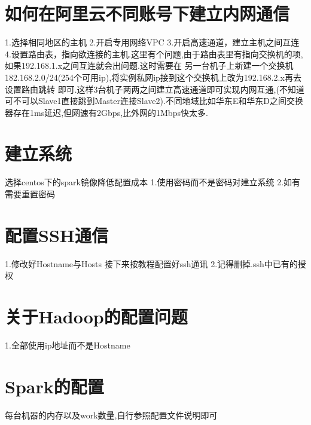 \section{如何在阿里云不同账号下建立内网通信}
1.选择相同地区的主机
2.开启专用网络VPC
3.开启高速通道，建立主机之间互连
4.设置路由表，指向欲连接的主机.这里有个问题,由于路由表里有指向交换机的项,如果192.168.1.x之间互连就会出问题.这时需要在
另一台机子上新建一个交换机182.168.2.0/24(254个可用ip),将实例私网ip接到这个交换机上改为192.168.2.x再去设置路由跳转
即可.这样3台机子两两之间建立高速通道即可实现内网互通,(不知道可不可以Slave1直接跳到Master连接Slave2).不同地域比如华东E和华东D之间交换器存在1ms延迟,但网速有2Gbps,比外网的1Mbps快太多.
\section{建立系统}
选择centos下的spark镜像降低配置成本
1.使用密码而不是密码对建立系统
2.如有需要重置密码
\section{配置SSH通信}
1.修改好Hostname与Hosts
接下来按教程配置好ssh通讯
2.记得删掉.ssh中已有的授权
\section{关于Hadoop的配置问题}
1.全部使用ip地址而不是Hostname
\section{Spark的配置}
每台机器的内存以及work数量,自行参照配置文件说明即可